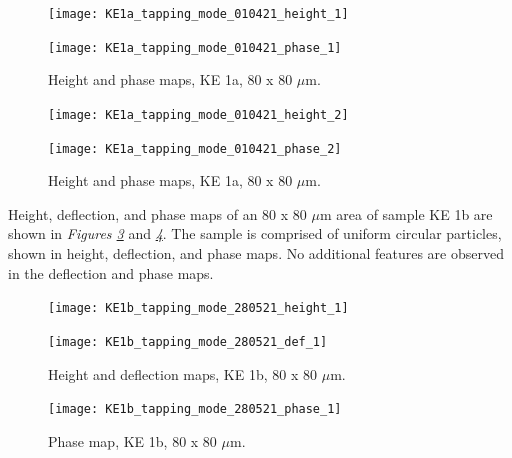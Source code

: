 \begin{figure}[H]
\centering
\begin{minipage}{.45\textwidth}
  \centering
  \texttt{[image: KE1a\_tapping\_mode\_010421\_height\_1]}
\end{minipage}
\begin{minipage}{.45\textwidth}
  \centering
  \texttt{[image: KE1a\_tapping\_mode\_010421\_phase\_1]}
\end{minipage}
\caption[Height and phase maps, KE 1a]{Height and phase maps, KE 1a, 80 x 80 $\mu$m.}
\label{fig:afm_ke1a_height_phase_1}
\end{figure}


\begin{figure}[H]
\centering
\begin{minipage}{.45\textwidth}
  \centering
  \texttt{[image: KE1a\_tapping\_mode\_010421\_height\_2]}
\end{minipage}
\begin{minipage}{.45\textwidth}
  \centering
  \texttt{[image: KE1a\_tapping\_mode\_010421\_phase\_2]}
\end{minipage}
\caption[Height and phase maps, KE 1a]{Height and phase maps, KE 1a, 80 x 80 $\mu$m.}
\label{fig:afm_ke1a_height_phase_2}
\end{figure}



Height, deflection, and phase maps of an 80 x 80 $\mu$m area of sample KE 1b are shown in \textit{Figures \ref{fig:afm_ke1b_height_def_1}} and \textit{\ref{fig:afm_ke1b_phase_1}}. The sample is comprised of uniform circular particles, shown in height, deflection, and phase maps. No additional features are observed in the deflection and phase maps.

\begin{figure}[H]
\centering
\begin{minipage}{.45\textwidth}
  \centering
  \texttt{[image: KE1b\_tapping\_mode\_280521\_height\_1]}
\end{minipage}
\begin{minipage}{.45\textwidth}
  \centering
  \texttt{[image: KE1b\_tapping\_mode\_280521\_def\_1]}
\end{minipage}
\caption[Height and deflection maps, KE 1b]{Height and deflection maps, KE 1b, 80 x 80 $\mu$m.}
\label{fig:afm_ke1b_height_def_1}
\end{figure}

\begin{figure}[H]
\centering
  \texttt{[image: KE1b\_tapping\_mode\_280521\_phase\_1]}
\caption[Phase map, KE 1b]{Phase map, KE 1b, 80 x 80 $\mu$m.}
\label{fig:afm_ke1b_phase_1}
\end{figure}

